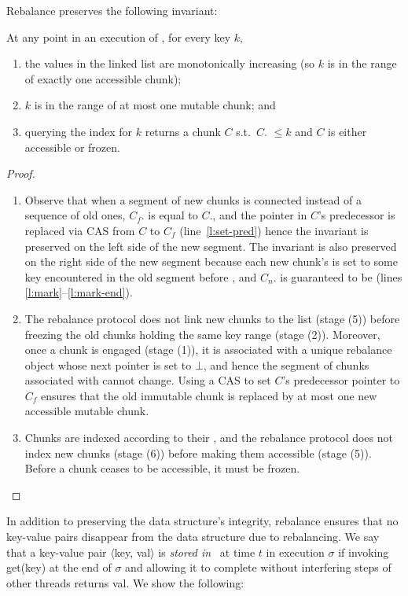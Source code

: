 Rebalance preserves the following invariant:
\begin{invariant}
At any point in an execution of \kiwi, for every key $k$,  
\begin{enumerate}
\item the  values in the linked list are monotonically increasing (so $k$ is in the range of exactly one accessible chunk);  
\item  $k$ is in the range of at most one mutable chunk; and 
\item querying the index for $k$  returns a chunk $C$ s.t.\  $C$. $\le k$ and $C$ is either accessible or frozen.
\end{enumerate}
\label{invariant:rebalance}
\end{invariant}
\begin{proof}
\begin{enumerate}
\item
Observe that when a segment of new chunks is connected instead of a sequence of old ones, $C_f$. is equal to $C$., 
and  the  pointer in $C$'s predecessor is replaced via CAS from $C$ to $C_f$ (line~\ref{l:set-pred}) hence the invariant is preserved on the left side of the new segment.
The invariant is also preserved on the right side of the new segment because each new chunk's  is set to some key encountered in the old segment before , 
and $C_n$. is guaranteed to be  (lines  \ref{l:mark}--\ref{l:mark-end}).  
\item
The rebalance protocol does not link new chunks to the list (stage (5)) 
before freezing the old chunks holding the same key range (stage (2)).
Moreover, once a chunk is engaged (stage (1)), it is associated with a unique rebalance object 
whose next pointer is set to $\bot$, 
and hence the segment of chunks associated with  cannot change. 
Using a CAS to set $C$'s predecessor  pointer to $C_f$ ensures 
that the old immutable chunk is replaced by at most one new accessible mutable chunk.
\item
Chunks are indexed according to their , and 
the rebalance protocol does not index new chunks (stage (6)) before making them accessible (stage (5)). 
Before a chunk ceases to be accessible, it must be frozen. 
\end{enumerate}
\end{proof}

In addition to preserving the data structure's integrity, rebalance ensures that no key-value pairs disappear from the data structure due to rebalancing. 
We say that a key-value pair $\langle$key, val$ \rangle$ is \emph{stored in} \kiwi\ at time $t$ in execution $\sigma$ if invoking get(key) at the end of $\sigma$
and allowing it to complete without interfering steps of other threads returns val. We show the following:

